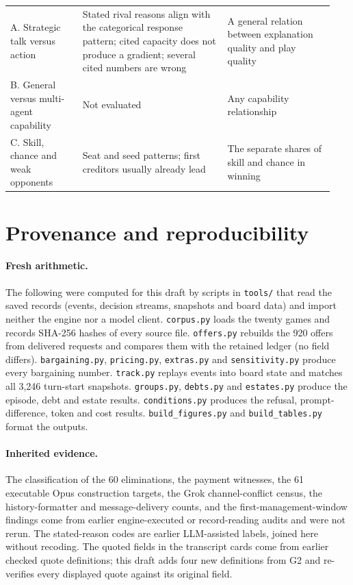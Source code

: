 \begin{longtable}{@{}L{0.21\linewidth}L{0.42\linewidth}L{0.31\linewidth}@{}}
\midrule
A. Strategic talk versus action & Stated rival reasons align with the categorical response pattern; cited capacity does not produce a gradient; several cited numbers are wrong & A general relation between explanation quality and play quality\\
B. General versus multi-agent capability & Not evaluated & Any capability relationship\\
C. Skill, chance and weak opponents & Seat and seed patterns; first creditors usually already lead & The separate shares of skill and chance in winning\\
\end{longtable}
\endgroup

\FloatBarrier
\section{Provenance and reproducibility}
\label{app:provenance}

\paragraph{Fresh arithmetic.} The following were computed for this draft by scripts in \texttt{tools/} that read the saved records (events, decision streams, snapshots and board data) and import neither the engine nor a model client. \texttt{corpus.py} loads the twenty games and records SHA-256 hashes of every source file. \texttt{offers.py} rebuilds the 920 offers from delivered requests and compares them with the retained ledger (no field differs). \texttt{bargaining.py}, \texttt{pricing.py}, \texttt{extras.py} and \texttt{sensitivity.py} produce every bargaining number. \texttt{track.py} replays events into board state and matches all 3,246 turn-start snapshots. \texttt{groups.py}, \texttt{debts.py} and \texttt{estates.py} produce the episode, debt and estate results. \texttt{conditions.py} produces the refusal, prompt-difference, token and cost results. \texttt{build\_figures.py} and \texttt{build\_tables.py} format the outputs.

\paragraph{Inherited evidence.} The classification of the 60 eliminations, the payment witnesses, the 61 executable Opus construction targets, the Grok channel-conflict census, the history-formatter and message-delivery counts, and the first-management-window findings come from earlier engine-executed or record-reading audits and were not rerun. The stated-reason codes are earlier LLM-assisted labels, joined here without recoding. The quoted fields in the transcript cards come from earlier checked quote definitions; this draft adds four new definitions from G2 and re-verifies every displayed quote against its original field.

